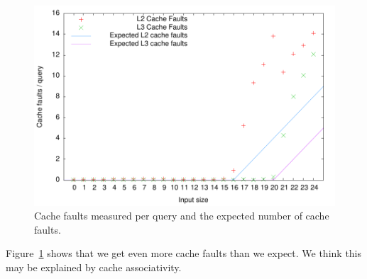 \begin{figure}[h!]
  \centering
  \includegraphics[width=\textwidth]{../week1/plots/outputs/bs_cachefaults}
  \caption{Cache faults measured per query and the expected number of cache faults.}
  \label{fig:bs_cachefaults}
\end{figure}

Figure~\ref{fig:bs_cachefaults} shows that we get even more cache
faults than we expect. We think this may be explained by cache
associativity.

